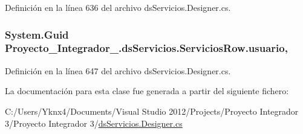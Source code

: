Definición en la línea 636 del archivo ds\-Servicios.\-Designer.\-cs.

\hypertarget{class_proyecto___integrador__3_1_1ds_servicios_1_1_servicios_row_a258338e08401da8418ebd0d6dede8ad2}{
\subsubsection[{usuario}]{\setlength{\rightskip}{0pt plus 5cm}System.\-Guid Proyecto\-\_\-\-Integrador\-\_.\-ds\-Servicios.\-Servicios\-Row.\-usuario\hspace{0.3cm}{\ttfamily [get]}, {\ttfamily [set]}}}\label{class_proyecto___integrador__3_1_1ds_servicios_1_1_servicios_row_a258338e08401da8418ebd0d6dede8ad2}


Definición en la línea 647 del archivo ds\-Servicios.\-Designer.\-cs.



La documentación para esta clase fue generada a partir del siguiente fichero\-:\begin{DoxyCompactItemize}
\item 
C\-:/\-Users/\-Yknx4/\-Documents/\-Visual Studio 2012/\-Projects/\-Proyecto Integrador 3/\-Proyecto Integrador 3/\hyperlink{ds_servicios_8_designer_8cs}{ds\-Servicios.\-Designer.\-cs}\end{DoxyCompactItemize}
